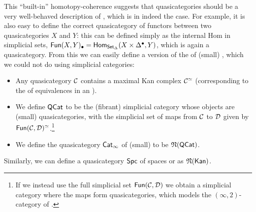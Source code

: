 \documentclass[a4paper,11pt]{article}
\begin{document}
This ``built-in'' homotopy-coherence suggests that quasicategories
should be a very well-behaved description of \icats{}, which is in
indeed the case. For example, it is also easy to define the correct
quasicategory of functors between two quasicategories $X$ and $Y$:
this can be defined simply as the internal Hom in simplicial sets,
\ie{}
$\textup{\textsf{Fun}}(X,Y)_{\bullet} = \textup{\textsf{Hom}}_{\textup{\textsf{Set}}_{\Delta}}(X \times \Delta^{\bullet}, Y)$,
which is again a quasicategory. From this we can easily define a
version of the \icat{} of (small) \icats{}, which we could not do
using simplicial categories:
\begin{itemize}
\item Any quasicategory $\mathcal{C}$ contains a maximal Kan complex $\mathcal{C}^{\simeq}$ (corresponding
  to the \igpd{} of equivalences in an \icat{}).
\item We define $\textup{\textsf{QCat}}$ to be the (fibrant) simplicial
  category whose objects are (small) quasicategories, with the
  simplicial set of maps from $\mathcal{C}$ to $\mathcal{D}$ given by
  $\textup{\textsf{Fun}}(\mathcal{C}, \mathcal{D})^{\simeq}$.\footnote{If we instead use the full
    simplicial set $\textup{\textsf{Fun}}(\mathcal{C}, \mathcal{D})$ we obtain a simplicial category
    where the maps form quasicategories, which models the
    $(\infty,2)$-category of \icats{}.}
\item We define the quasicategory $\textup{\textsf{Cat}}_\infty$ of (small) \icats{} to be
  $\mathfrak{N}(\textup{\textsf{QCat}})$.
\end{itemize}
Similarly, we can define a quasicategory
$\textup{\textsf{Spc}}$ of spaces or \igpds{} as $\mathfrak{N}(\textup{\textsf{Kan}})$.
\end{document}
